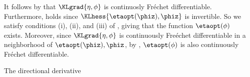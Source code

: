 It follows by \citet[Proposition 4.14(c)]{zeidler:2013:functional} that
$\KLgrad{\eta, \phi}$ is continuosly Fr{\'e}chet differentiable.  Furthermore,
\citet[Chapter 4 Condition 21b]{zeidler:2013:functional} holds since
$\KLhess{\etaopt(\phiz), \phiz}$ is invertible.  So we satisfy conditions (i),
(ii), and (iii) of \citet[Theorem 4.B(c)]{zeidler:2013:functional}, giving that
the function $\etaopt(\phi)$ exists.  Moreover, since $\KLgrad{\eta, \phi}$ is
continuously Fre{\'e}chet differentiable in a neighborhood of $\etaopt(\phiz),
\phiz$, by \citet[Theorem 4.B(d)]{zeidler:2013:functional}, $\etaopt(\phi)$ is
also continuously Fr{\'e}chet differentiable.

The directional derivative

%
















